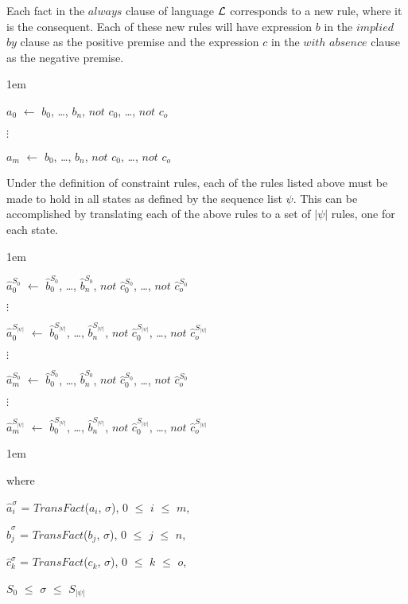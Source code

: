 \documentclass[glov2,twocolumn,final]{svjour2}
\newenvironment{vquote}
  {\begin{list}{}{\leftmargin 1em}\item[]}
  {\end{list}}
\begin{document}
          Each fact in the $always$ clause of language ${\cal L}$ corresponds
          to a new rule, where it is the consequent. Each of these new rules
          will have expression $b$ in the $implied$ $by$ clause as the positive
          premise and the expression $c$ in the $with$ $absence$ clause as the
          negative premise.

          \begin{vquote}
            $a_{0}$ $\leftarrow$
            $b_{0}$, \ldots, $b_{n}$,
            $not$ $c_{0}$, \ldots, $not$ $c_{o}$

            $\vdots$

            $a_{m}$ $\leftarrow$
            $b_{0}$, \ldots, $b_{n}$,
            $not$ $c_{0}$, \ldots, $not$ $c_{o}$
          \end{vquote}

          Under the definition of constraint rules, each of the rules listed
          above must be made to hold in all states as defined by the sequence
          list $\psi$. This can be accomplished by translating each of the
          above rules to a set of $|\psi|$ rules, one for each state.

           \begin{vquote}
            $\hat{a}^{S_{0}}_{0}$ $\leftarrow$
            $\hat{b}^{S_{0}}_{0}$, \ldots, $\hat{b}^{S_{0}}_{n}$,
            $not$ $\hat{c}^{S_{0}}_{0}$, \ldots, $not$ $\hat{c}^{S_{0}}_{o}$

            $\vdots$

            $\hat{a}^{S_{|\psi|}}_{0}$ $\leftarrow$
            $\hat{b}^{S_{|\psi|}}_{0}$, \ldots, $\hat{b}^{S_{|\psi|}}_{n}$,
            $not$ $\hat{c}^{S_{|\psi|}}_{0}$, \ldots, $not$ $\hat{c}^{S_{|\psi|}}_{o}$

            $\vdots$

            $\hat{a}^{S_{0}}_{m}$ $\leftarrow$
            $\hat{b}^{S_{0}}_{0}$, \ldots, $\hat{b}^{S_{0}}_{n}$,
            $not$ $\hat{c}^{S_{0}}_{0}$, \ldots, $not$ $\hat{c}^{S_{0}}_{o}$

            $\vdots$

            $\hat{a}^{S_{|\psi|}}_{m}$ $\leftarrow$
            $\hat{b}^{S_{|\psi|}}_{0}$, \ldots, $\hat{b}^{S_{|\psi|}}_{n}$,
            $not$ $\hat{c}^{S_{|\psi|}}_{0}$, \ldots, $not$ $\hat{c}^{S_{|\psi|}}_{o}$
          \end{vquote}

          \begin{vquote}
            where

            $\hat{a}^{\sigma}_{i}$ = $TransFact$($a_{i}$, $\sigma$),
            $0$ $\leq$ $i$ $\leq$ $m$,

            $\hat{b}^{\sigma}_{j}$ = $TransFact$($b_{j}$, $\sigma$),
            $0$ $\leq$ $j$ $\leq$ $n$,

            $\hat{c}^{\sigma}_{k}$ = $TransFact$($c_{k}$, $\sigma$),
            $0$ $\leq$ $k$ $\leq$ $o$,

            $S_{0}$ $\leq$ $\sigma$ $\leq$ $S_{|\psi|}$
          \end{vquote}
\end{document}
